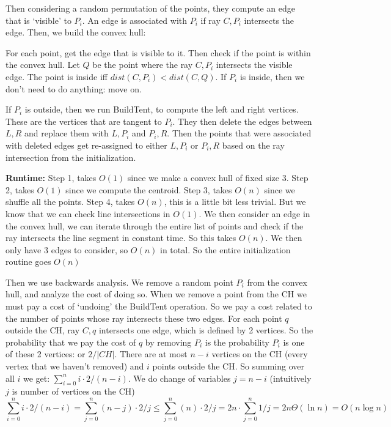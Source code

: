 \documentclass[11pt]{article}
\begin{document}
Then considering a random permutation of the points, they compute an edge that is `visible' to $P_i$.
An edge is associated with $P_i$ if ray $C, P_i$ intersects the edge. 
Then, we build the convex hull:

For each point, get the edge that is visible to it. Then check if the point is within the convex hull.
Let $Q$ be the point where the ray $C, P_i$ intersects the visible edge. The point is inside iff $dist(C, P_i) < dist(C, Q)$.
If $P_i$ is inside, then we don't need to do anything: move on.

If $P_i$ is outside, then we run BuildTent, to compute the left and right vertices. 
These are the vertices that are tangent to $P_i$. 
They then delete the edges between $L, R$ and replace them with $L,P_i$ and $P_i, R$.
Then the points that were associated with deleted edges get re-assigned to either 
$L,P_i$ or $P_i, R$ based on the ray intersection from the initialization.

\textbf{Runtime: }
Step 1, takes $O(1)$ since we make a convex hull of fixed size 3.
Step 2, takes $O(1)$ since we compute the centroid.
Step 3, takes $O(n)$ since we shuffle all the points. 
Step 4, takes $O(n)$, this is a little bit less trivial. But we know that we can check
line intersections in $O(1)$. We then consider an edge in the convex hull, we can iterate through
the entire list of points and check if the ray intersects the line segment in constant time. So this takes $O(n)$.
We then only have 3 edges to consider, so $O(n)$ in total.
So the entire initialization routine goes $O(n)$

Then we use backwards analysis. We remove a random point $P_i$ from the convex hull,
and analyze the cost of doing so. When we remove a point from the CH we must pay a cost of `undoing' the BuildTent operation.
So we pay a cost related to the number of points whose ray intersects these two edges.
For each point $q$ outside the CH, ray $C,q$ intersects one edge, which is defined by 2 vertices.
So the probability that we pay the cost of $q$ by removing $P_i$ is the probability $P_i$ is one
of these 2 vertices: or $2/|CH|$. There are at most $n-i$ vertices on the CH (every vertex that we haven't removed)
and $i$ points outside the CH. So summing over all $i$ we get:
$\sum_{i = 0} ^n i \cdot 2/(n-i)$. We do change of variables $j = n-i$ (intuitively $j$ is number of vertices on the CH)
$$\sum_{i = 0} ^n i \cdot 2/(n-i) = \sum_{j = 0} ^n (n-j) \cdot 2/j \leq \sum_{j = 0} ^n (n) \cdot 2/j = 2n \cdot \sum_{j = 0} ^n 1/j = 2n \Theta(\ln n) = O(n \log n)$$
\end{document}
